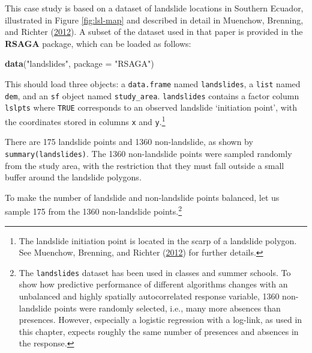 \documentclass[]{krantz}
\newenvironment{Shaded}{\begin{snugshade}}{\end{snugshade}}
\newcommand{\DataTypeTok}[1]{\textcolor[rgb]{0.27,0.27,0.27}{#1}}
\newcommand{\KeywordTok}[1]{\textcolor[rgb]{0.27,0.27,0.27}{\textbf{#1}}}
\newcommand{\NormalTok}[1]{#1}
\newcommand{\StringTok}[1]{\textcolor[rgb]{0.5,0.5,0.5}{#1}}
\let\rmarkdownfootnote\footnote%
\def\footnote{\protect\rmarkdownfootnote}
\begin{document}
This case study is based on a dataset of landslide locations in Southern Ecuador, illustrated in Figure \ref{fig:lsl-map} and described in detail in Muenchow, Brenning, and Richter (\protect\hyperlink{ref-muenchow_geomorphic_2012}{2012}).
A subset of the dataset used in that paper is provided in the \textbf{RSAGA} package, which can be loaded as follows:

\begin{Shaded}
\begin{Highlighting}[]
\KeywordTok{data}\NormalTok{(}\StringTok{"landslides"}\NormalTok{, }\DataTypeTok{package =} \StringTok{"RSAGA"}\NormalTok{)}
\end{Highlighting}
\end{Shaded}

This should load three objects: a \texttt{data.frame} named \texttt{landslides}, a \texttt{list} named \texttt{dem}, and an \texttt{sf} object named \texttt{study\_area}.
\texttt{landslides} contains a factor column \texttt{lslpts} where \texttt{TRUE} corresponds to an observed landslide `initiation point', with the coordinates stored in columns \texttt{x} and \texttt{y}.\footnote{The landslide initiation point is located in the scarp of a landslide polygon. See Muenchow, Brenning, and Richter (\protect\hyperlink{ref-muenchow_geomorphic_2012}{2012}) for further details.}

There are 175 landslide points and 1360 non-landslide, as shown by \texttt{summary(landslides)}.
The 1360 non-landslide points were sampled randomly from the study area, with the restriction that they must fall outside a small buffer around the landslide polygons.

To make the number of landslide and non-landslide points balanced, let us sample 175 from the 1360 non-landslide points.\footnote{The \texttt{landslides} dataset has been used in classes and summer schools.
  To show how predictive performance of different algorithms changes with an unbalanced and highly spatially autocorrelated response variable, 1360 non-landslide points were randomly selected, i.e., many more absences than presences.
  However, especially a logistic regression with a log-link, as used in this chapter, expects roughly the same number of presences and absences in the response.}
\end{document}
